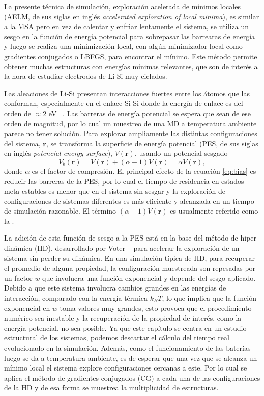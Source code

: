 La presente técnica de simulación, exploración acelerada de mínimos locales (AELM,
de sus siglas en inglés \textit{accelerated exploration of local minima}), es 
similar a la MSA pero en vez de calentar y enfriar lentamente el sistema, se 
utiliza un sesgo en la función de energía potencial para sobrepasar las barrearas
de energía y luego se realiza una minimización local, con algún minimizador local 
como gradientes conjugados o LBFGS, para encontrar el mínimo. Este método permite 
obtener muchas estructuras con energías mínimas relevantes, que son de interés a 
la hora de estudiar electrodos de Li-Si muy ciclados.

Las aleaciones de Li-Si presentan interacciones fuertes entre los átomos que las
conforman, especialmente en el enlace Si-Si donde la energía de enlace es del
orden de $\approx$2 eV ~\cite{wypych2018handbook}. Las barreras de 
energía potencial se espera que sean de ese orden de magnitud, por lo cual un 
muestreo de una MD a temperatura ambiente parece no tener solución. Para explorar 
ampliamente las distintas configuraciones del sistema, $\mathbf{r}$, se 
transforma la superficie de energía potencial (PES, de sus siglas en inglés 
\textit{potencial energy surface}), $V(\mathbf{r})$, usando un potencial sesgado
\begin{equation}\label{eq:bias}
    V_b(\mathbf{r}) = V(\mathbf{r}) + (\alpha - 1) V(\mathbf{r}) = \alpha V(\mathbf{r}),
\end{equation}
donde $\alpha$ es el factor de compresión. El principal efecto de la ecuación 
\ref{eq:bias} es reducir las barreras de la PES, por lo cual el tiempo de
residencia en estados meta-estables es menor que en el sistema sin sesgar y la 
exploración de configuraciones de sistemas diferentes es más eficiente y 
alcanzada en un tiempo de simulación razonable. El término 
$(\alpha - 1) V(\mathbf{r})$ es usualmente referido como la 
.

La adición de esta función de sesgo a la PES está en la base del método de 
hiper-dinámica (HD), desarrollado por Voter ~\cite{voter1997HD,voter1997method} 
para acelerar la exploración de un sistema sin perder su dinámica. En una 
simulación típica de HD, para recuperar el promedio de alguna propiedad, la 
configuración muestreada son repesadas por un factor $w$ que involucra una función
exponencial y depende del sesgo aplicado. Debido a que este sistema involucra 
cambios grandes en las energías de interacción, comparado con la energía térmica
$k_BT$, lo que implica que la función exponencial en $w$ toma valores muy grandes,
esto provoca que el procedimiento numérico sea inestable y la recuperación de 
la propiedad de interés, como la energía potencial, no sea posible. Ya que este
capítulo se centra en un estudio estructural de los sistemas, podemos descartar
el cálculo del tiempo real evolucionado en la simulación. Además, como el 
funcionamiento de las baterías luego se da a temperatura ambiente, es de esperar
que una vez que se alcanza un mínimo local el sistema explore configuraciones
cercanas a este. Por lo cual se aplica el método de gradientes conjugados (CG)
a cada una de las configuraciones de la HD y de esa forma se muestrea la 
multiplicidad de estructuras.

